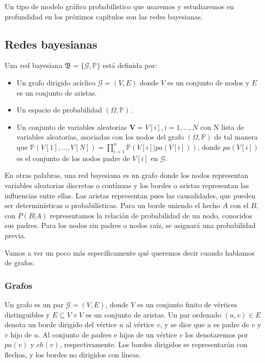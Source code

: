 Un tipo de modelo gráfico probabilístico que usaremos y estudiaremos en profundidad en los próximos 
capítulos son las redes bayesianas.

\subsection{Redes bayesianas} \label{subsect: BN}
\begin{definicion} \label{def:BN}
Una red bayesiana \cite{def-bncn} $\mathfrak{B} = \lbrace \mathcal{G}, \mathbb{P} \rbrace$ está definida por:
\begin{itemize}
    \item Un grafo dirigido acíclico $\mathcal{G}=(V,E)$ donde $V$ es un conjunto de nodos y $E$ 
    es un conjunto de aristas.
    \item Un espacio de probabilidad $(\Omega, \mathbb{P})$.
    \item Un conjunto de variables aleatorias $\textbf{V}=V[i], i=1,...,N$ con N lista de variables aleatorias, 
    asociadas con los nodos del grafo $(\Omega, \mathbb{P})$ 
    de tal manera que $\mathbb{P}(V[1],...,V[N])= \prod_{i=1}^{n}\mathbb{P}(V[i]|pa(V[i]))$, donde $pa(V[i])$ es el 
    conjunto de los nodos padre de $V[i]$ en $\mathcal{G}$.  
\end{itemize}
\end{definicion} 

En otras palabras, una red bayesiana es un grafo donde los nodos representan variables aleatorias discretas 
o contínuas y los bordes o aristas representan las influencias entre ellas. Las aristas 
representan pues las causalidades, que pueden ser determinísticas o probabilísticas. Para un borde 
uniendo el hecho $A$ con el $B$, con $P(B|A)$ representamos la relación de probabilidad de un 
nodo, conocidos sus padres. Para los nodos sin padres o nodos raíz, se asignará una probabilidad previa.

Vamos a ver un poco más específicamente qué queremos decir cuando hablamos de grafos.
\subsubsection{Grafos}
\begin{definicion} \label{def:grafo}
Un grafo es un par $\mathcal{G} = (V, E)$, donde $V$ es un conjunto finito de vértices distinguibles y 
$E \subseteq V \times V$ es un conjunto de aristas. Un par ordenado $(u, v) \in E$ denota un borde dirigido
del vértice $u$ al vértice $v$, y se dice que $u$ es padre de $v$ y $v$ hijo de $u$. Al conjunto de padres 
e hijos de un vértice $v$ los denotaremos por $pa(v)$ y $ch(v)$, respectivamente. Los bordes dirigidos 
se representarán con flechas, y los bordes no dirigidos con líneas. 
\end{definicion}

